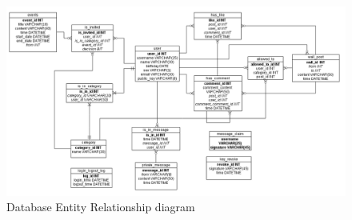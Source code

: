 \clearpage

\begin{landscape}
\begin{figure}[h]
    
    \includegraphics[width=1.4\textwidth]{images/design/project_er_diagram.png}
    \caption{Database Entity Relationship diagram}
    \label{fig:db_er_diag}
\end{figure}
\end{landscape}